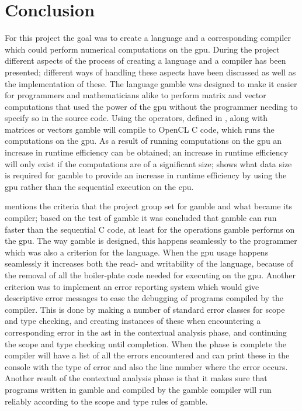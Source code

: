 \chapter{Conclusion} %
\label{cha:conclusion}
For this project the goal was to create a language and a corresponding compiler which could perform numerical computations on the \acrshort{gpu}.
During the project different aspects of the process of creating a language and a compiler has been presented; different ways of handling these aspects have been discussed as well as the implementation of these.
The language \gls{gamble} was designed to make it easier for programmers and mathematicians alike to perform matrix and vector computations that used the power of the \acrshort{gpu} without the programmer needing to specify so in the source code.
Using the operators, defined in , along with matrices or vectors \gls{gamble} will compile to OpenCL C code, which runs the computations on the \acrshort{gpu}.
As a result of running computations on the \acrshort{gpu} an increase in runtime efficiency can be obtained; an increase in runtime efficiency will only exist if the computations are of a significant size;  shows what data size is required for \gls{gamble} to provide an increase in runtime efficiency by using the \acrshort{gpu} rather than the sequential execution on the \acrshort{cpu}.

 mentions the criteria that the project group set for \gls{gamble} and what became its compiler; based on the test of \gls{gamble} it was concluded that \gls{gamble} can run faster than the sequential C code, at least for the operations \gls{gamble} performs on the \acrshort{gpu}.
The way \gls{gamble} is designed, this happens seamlessly to the programmer which was also a criterion for the language.
When the \acrshort{gpu} usage happens seamlessly it increases both the read- and writability of the language, because of the removal of all the boiler-plate code needed for executing on the \acrshort{gpu}.
Another criterion was to implement an error reporting system which would give descriptive error messages to ease the debugging of programs compiled by the compiler.
This is done by making a number of standard error classes for scope and type checking, and creating instances of these when encountering a corresponding error in the \acrshort{ast} in the contextual analysis phase, and continuing the scope and type checking until completion.
When the phase is complete the compiler will have a list of all the errors encountered and can print these in the console with the type of error and also the line number where the error occurs.
Another result of the contextual analysis phase is that it makes sure that programs written in \gls{gamble} and compiled by the \gls{gamble} compiler will run reliably according to the scope and type rules of \gls{gamble}.

